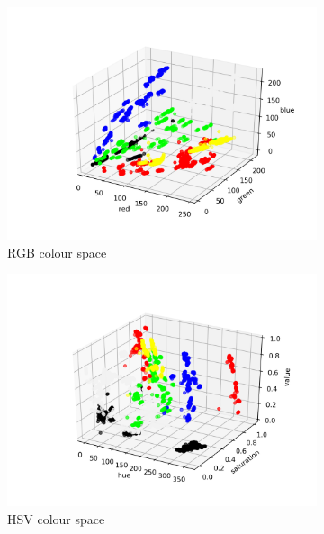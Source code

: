 \documentclass[12pt,a4paper]{article}
\begin{document}
	\begin{center}
		\begin{figure}[H]
			\begin{subfigure}{.5\linewidth}
				\includegraphics[width=\linewidth]{images/rgb_labels.png}
				\caption{RGB colour space}
			\end{subfigure}
			\begin{subfigure}{.5\linewidth}
				\includegraphics[width=\linewidth]{images/hsv_labels.png}
				\caption{HSV colour space}
			\end{subfigure}
			\begin{subfigure}{.5\linewidth}
				\centering

\end{subfigure}
\end{figure}
\end{center}
\end{document}
